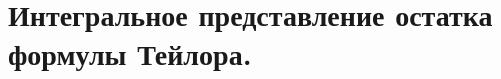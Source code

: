 \documentclass[../main.tex]{subfiles}
\begin{document}
\newpage
\section{Интегральное представление остатка формулы Тейлора.}
\end{document}
